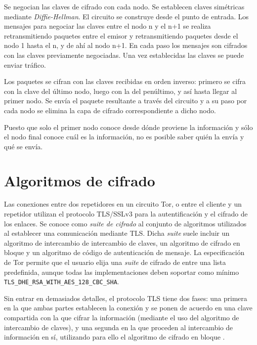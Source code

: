 \documentclass[
  a4paper,
  12pt,
  spanish,
]{scrartcl}
\begin{document}
Se negocian las claves de cifrado con cada nodo. Se establecen claves simétricas mediante \textit{Diffie-Hellman}. El circuito se construye desde el punto de entrada. Los mensajes para negociar las claves entre el nodo n y el n+1 se realiza retransmitiendo paquetes entre el emisor y retransmitiendo paquetes desde el nodo 1 hasta el n, y de ahí al nodo n+1. En cada paso los mensajes son cifrados con las claves previamente negociadas. Una vez establecidas las claves se puede enviar tráfico.


Los paquetes se cifran con las claves recibidas en orden inverso: primero se cifra con la clave del último nodo, luego con la del penúltimo, y así hasta llegar al primer nodo. Se envía el paquete resultante a través del circuito y a su paso por cada nodo se elimina la capa de cifrado correspondiente a dicho nodo.


Puesto que solo el primer nodo conoce desde dónde proviene la información y sólo el nodo final conoce cuál es la información, no es posible saber quién la envía y qué se envía.

\section{Algoritmos de cifrado}

Las conexiones entre dos repetidores en un circuito Tor, o entre el cliente y un repetidor utilizan el protocolo TLS/SSLv3 para la autentificación y el cifrado de los enlaces.
Se conoce como \textit{suite de cifrado} al conjunto de algoritmos utilizados al establecer una comunicación mediante TLS.
Dicha \textit{suite} suele incluir un algoritmo de intercambio de intercambio de claves, un algoritmo de cifrado en bloque y un algoritmo de código de autenticación de mensaje.
La especificación de Tor \parencite{dingledine_tor_2019} permite que el usuario elija una \textit{suite} de cifrado de entre una lista predefinida, aunque todas las implementaciones deben soportar como mínimo \texttt{TLS\_DHE\_RSA\_WITH\_AES\_128\_CBC\_SHA}.

Sin entrar en demasiados detalles, el protocolo TLS tiene dos fases: una primera en la que ambas partes establecen la conexión y se ponen de acuerdo en una clave compartida con la que cifrar la información (mediante el uso del algoritmo de intercambio de claves), y una segunda en la que proceden al intercambio de información en sí, utilizando para ello el algoritmo de cifrado en bloque \parencite{ibm_overview_2019}.
\end{document}
